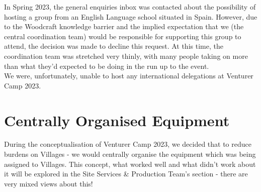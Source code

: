 In Spring 2023, the general enquiries inbox was contacted about the possibility of hosting a group from an English Language school situated in Spain. However, due to the Woodcraft knowledge barrier and the implied expectation that we (the central coordination team) would be responsible for supporting this group to attend, the decision was made to decline this request. At this time, the coordination team was stretched very thinly, with many people taking on more than what they'd expected to be doing in the run up to the event.\\

We were, unfortunately, unable to host any international delegations at Venturer Camp 2023. 

\section{Centrally Organised Equipment}
During the conceptualisation of Venturer Camp 2023, we decided that to reduce burdens on Villages - we would centrally organise the equipment which was being assigned to Villages. This concept, what worked well and what didn't work about it will be explored in the Site Services \& Production Team's section - there are very mixed views about this!

